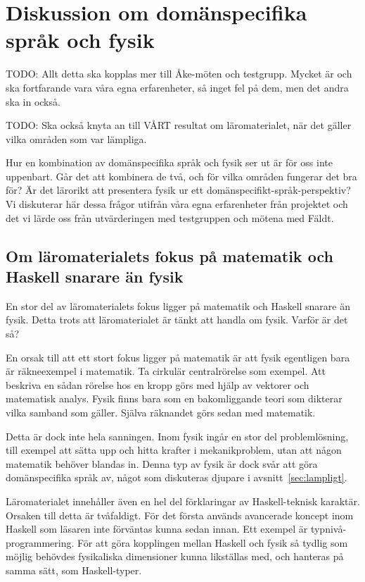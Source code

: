 
\chapter{Diskussion om domänspecifika språk och fysik}
\label{cha:disk2}

\begin{binge}

TODO: Allt detta ska kopplas mer till Åke-möten och testgrupp. Mycket är och ska fortfarande vara våra egna erfarenheter, så inget fel på dem, men det andra ska in också.

TODO: Ska också knyta an till VÅRT resultat om läromaterialet, när det gäller vilka områden som var lämpliga.

Hur en kombination av domänspecifika språk och fysik ser ut är för oss inte uppenbart. Går det att kombinera de två, och för vilka områden fungerar det bra för? Är det lärorikt att presentera fysik ur ett domänspecifikt-språk-perspektiv? Vi diskuterar här dessa frågor utifrån våra egna erfarenheter från projektet och det vi lärde oss från utvärderingen med testgruppen och mötena med Fäldt. 

\section{Om läromaterialets fokus på matematik och Haskell snarare än fysik}

En stor del av läromaterialets fokus ligger på matematik och Haskell snarare än fysik. Detta trots att läromaterialet är tänkt att handla om fysik. Varför är det så?

En orsak till att ett stort fokus ligger på matematik är att fysik egentligen bara är räkneexempel i matematik. Ta cirkulär centralrörelse som exempel. Att beskriva en sådan rörelse hos en kropp görs med hjälp av vektorer och matematisk analys. Fysik finns bara som en bakomliggande teori som dikterar vilka samband som gäller. Själva räknandet görs sedan med matematik.

Detta är dock inte hela sanningen. Inom fysik ingår en stor del problemlösning, till exempel att sätta upp och hitta krafter i mekanikproblem, utan att någon matematik behöver blandas in. Denna typ av fysik är dock svår att göra domänspecifika språk av, något som diskuteras djupare i avsnitt~\ref{sec:lampligt}.

Läromaterialet innehåller även en hel del förklaringar av Haskell-teknisk karaktär. Orsaken till detta är tvåfaldigt. För det första används avancerade koncept inom Haskell som läsaren inte förväntas kunna sedan innan. Ett exempel är typnivå-programmering. För att göra kopplingen mellan Haskell och fysik så tydlig som möjlig behövdes fysikaliska dimensioner kunna likställas med, och hanteras på samma sätt, som Haskell-typer.


\end{binge}
